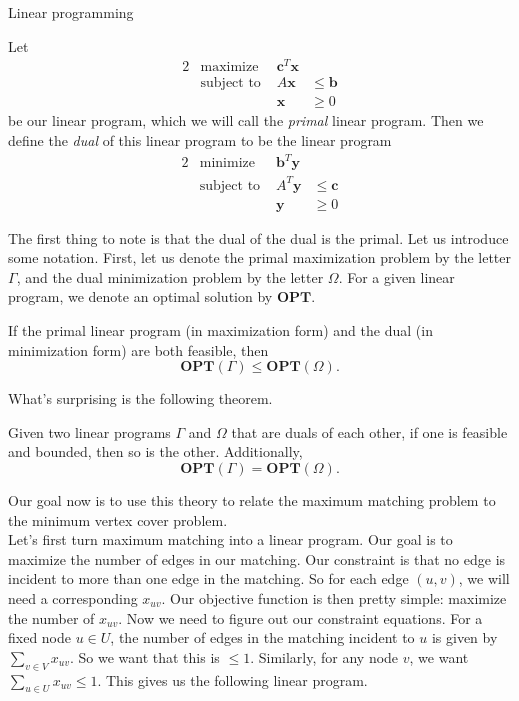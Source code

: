 \documentclass[11pt]{article}
\renewcommand{\'}{^{'}}
\newenvironment{theorem}[2][Theorem]{\begin{trivlist}
\item[\hskip \labelsep {\bfseries #1}\hskip \labelsep {\bfseries #2.}]}{\end{trivlist}}
\newenvironment{definition}[2][Definition]{\begin{trivlist}
\item[\hskip \labelsep {\bfseries #1}\hskip \labelsep {\bfseries #2.}]}{\end{trivlist}}
\begin{document}
\begin{section}{Linear programming}
	\begin{definition}{(Dual)}
		Let 
		\begin{alignat*}{2}
			& \text{maximize } & \mathbf{c}^{T}\mathbf{x} \\
			& \text{subject to } & A\mathbf{x} & \leq \mathbf{b} \\
			&& \mathbf{x} &\geq 0
		\end{alignat*}
		be our linear program, which we will call the \emph{primal} linear program. Then we 
		define the \emph{dual} of this linear program to be the linear program
		\begin{alignat*}{2}
			& \text{minimize } & \mathbf{b}^{T}\mathbf{y} \\
			& \text{subject to } & A^{T}\mathbf{y} & \leq \mathbf{c} \\
			&& \mathbf{y} &\geq 0
		\end{alignat*}
	\end{definition}
	The first thing to note is that the dual of the dual is the primal. Let us introduce some 
	notation. First, let us denote the primal maximization problem by the letter $\Gamma$, and 
	the dual minimization problem by the letter $\Omega$. For a given linear program, we denote 
	an optimal solution by $\mathbf{OPT}$. 

	\begin{theorem}{(Weak duality)}
		If the primal linear program (in maximization form) and the dual (in minimization 
		form) are both feasible, then 
		\[
			\mathbf{OPT}(\Gamma) \leq \mathbf{OPT}(\Omega).
		\]
	\end{theorem}
	What's surprising is the following theorem.

	\begin{theorem}{(Strong duality)}
		Given two linear programs $\Gamma$ and $\Omega$ that are duals of each other, if one is 
		feasible and bounded, then so is the other. Additionally, 
		\[
			\mathbf{OPT}(\Gamma) = \mathbf{OPT}(\Omega).
		\]
	\end{theorem}
	Our goal now is to use this theory to relate the maximum matching problem to the minimum 
	vertex cover problem.\\
	Let's first turn maximum matching into a linear program. Our goal is to maximize the number 
	of edges in our matching. Our constraint is that no edge is incident to more than one edge 
	in the matching. So for each edge $(u,v)$, we will need a corresponding $x_{uv}$. Our objective 
	function is then pretty simple: maximize the number of $x_{uv}$. Now we need to figure out 
	our constraint equations. For a fixed node $u\in U$, the number of edges in the matching 
	incident 
	to $u$ is given by $\sum_{v\in V} x_{uv}$. So we want that this is $\leq 1$. Similarly, for any 
	node $v$, we want $\sum_{u\in U} x_{uv} \leq 1$. This gives us the following linear program.


\end{section}
\end{document}
